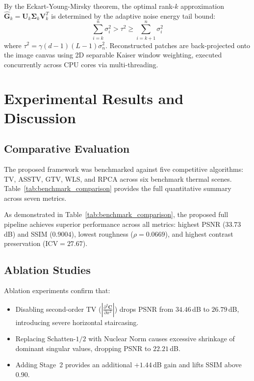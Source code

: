 \documentclass[lettersize,journal]{IEEEtran}
\begin{document}
By the Eckart-Young-Mirsky theorem, the optimal rank-$k$ approximation $\hat{\mathbf{G}}_k = \mathbf{U}_k \mathbf{\Sigma}_k \mathbf{V}_k^T$ is determined by the adaptive noise energy tail bound:
\begin{equation}
    \sum_{i=k}^{n} \sigma_i^2 > \tau^2 \ge \sum_{i=k+1}^n \sigma_i^2
\end{equation}
where $\tau^2 = \gamma (d-1)(L-1)\sigma_n^2$. Reconstructed patches are back-projected onto the image canvas using 2D separable Kaiser window weighting, executed concurrently across CPU cores via multi-threading.

\section{Experimental Results and Discussion}
\subsection{Comparative Evaluation}
The proposed framework was benchmarked against five competitive algorithms: TV, ASSTV, GTV, WLS, and RPCA across six benchmark thermal scenes. Table~\ref{tab:benchmark_comparison} provides the full quantitative summary across seven metrics.



As demonstrated in Table~\ref{tab:benchmark_comparison}, the proposed full pipeline achieves superior performance across all metrics: highest PSNR ($33.73$\,dB) and SSIM ($0.9004$), lowest roughness ($\rho = 0.0669$), and highest contrast preservation ($\mathrm{ICV} = 27.67$).

\subsection{Ablation Studies}
Ablation experiments confirm that:
\begin{itemize}
    \item Disabling second-order TV ($|\frac{\partial^2 \mathbf{C}}{\partial x^2}|$) drops PSNR from $34.46$\,dB to $26.79$\,dB, introducing severe horizontal staircasing.
    \item Replacing Schatten-$1/2$ with Nuclear Norm causes excessive shrinkage of dominant singular values, dropping PSNR to $22.21$\,dB.
    \item Adding Stage~2 provides an additional $+1.44$\,dB gain and lifts SSIM above $0.90$.
\end{itemize}
\end{document}
